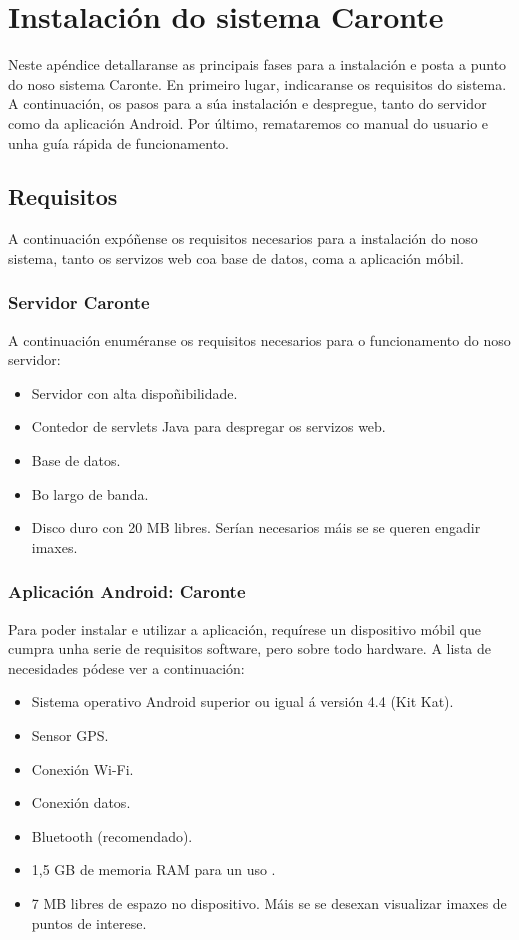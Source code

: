 \chapter{Instalación do sistema Caronte}

Neste apéndice detallaranse as principais fases para a instalación e posta a punto do noso sistema Caronte.
En primeiro lugar, indicaranse os requisitos do sistema. A continuación, os pasos para a súa instalación e despregue, tanto do servidor como da aplicación Android.
Por último, remataremos co manual do usuario e unha guía rápida de funcionamento.

\section{Requisitos}
A continuación expóñense os requisitos necesarios para a instalación do noso sistema, tanto os servizos web coa base de datos, coma a aplicación móbil.

\subsection{Servidor Caronte}
A continuación enuméranse os requisitos necesarios para o funcionamento do noso servidor:

\begin{itemize}
	\item Servidor con alta dispoñibilidade.
	\item Contedor de servlets Java para despregar os servizos web.
	\item Base de datos.
	\item Bo largo de banda.
	\item Disco duro con 20 MB libres. Serían necesarios máis se se queren engadir imaxes.
\end{itemize}

\subsection{Aplicación Android: Caronte}
Para poder instalar e utilizar a aplicación, requírese un dispositivo móbil que cumpra unha serie de requisitos software, pero sobre todo hardware. A lista de necesidades pódese ver a continuación:

\begin{itemize}
	\item Sistema operativo Android superior ou igual á versión 4.4 (Kit Kat).
	\item Sensor GPS.
	\item Conexión Wi-Fi.
	\item Conexión datos.
	\item Bluetooth (recomendado).
	\item 1,5 GB de memoria RAM para un uso .
	\item 7 MB libres de espazo no dispositivo. Máis se se desexan visualizar imaxes de puntos de interese.
\end{itemize}

